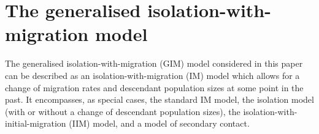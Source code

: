 \documentclass[11pt]{article}
\begin{document}

\section{The generalised isolation-with-migration model}

The generalised isolation-with-migration (GIM) model considered in this paper can be described as an isolation-with-migration (IM) model which allows for a change of migration rates and descendant population sizes at some point in the past. It encompasses, as special cases,
the standard IM model, the isolation model (with or without a change of descendant population sizes), the isolation-with-initial-migration (IIM) model, and a model of secondary contact.
\end{document}
